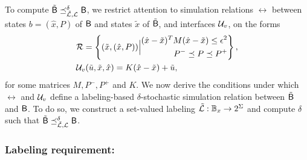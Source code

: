 \documentclass{ifacconf}
\begin{document}

To compute $\tilde {\mathsf{B}}\preceq^\delta_{\tilde {\mathcal{L}},\mathcal{L}} \mathsf{B}$, we restrict attention to simulation relations $\rel$ between states $b=(\hat x, P)$ of $\mathsf{B}$ and states $\tilde x$ of $\tilde {\mathsf{B}} $, and interfaces $\mathcal{U}_{v}$, on the forms
\begin{align}
  \label{eq:rel}
    & \mathcal{R} = \left\{(\tilde x, (\hat x, P ) ) \Big{|}\begin{aligned}
      (\hat x- \tilde x)^T M(\hat x-\tilde x)\leq \epsilon^2 \\
      P^-\preceq P \preceq   P^+
    \end{aligned} \right\}, \\
    & \mathcal{U}_{v}(\tilde u,  \tilde x, \hat x)  =K( \hat x - \tilde x)+\tilde u,  \label{eq:intf}
\end{align}
for some matrices $M, P^-, P^+$ and $K$. We now derive the conditions under which $\rel$ and $\mathcal{U}_{v}$ define a labeling-based $\delta$-stochastic simulation relation between $\tilde {\mathsf{B}}$ and $\mathsf{B}$. To do so, we construct a set-valued labeling $\tilde {\mathcal{L}}: \mathbb{B}_{x}\rightarrow 2^\Sigma$ and compute $\delta$ such that $\tilde {\mathsf{B}}\preceq^\delta_{\tilde{\mathcal{L}},\mathcal{L}} \mathsf{B} $.

\subsubsection{Labeling requirement:}
\end{document}
